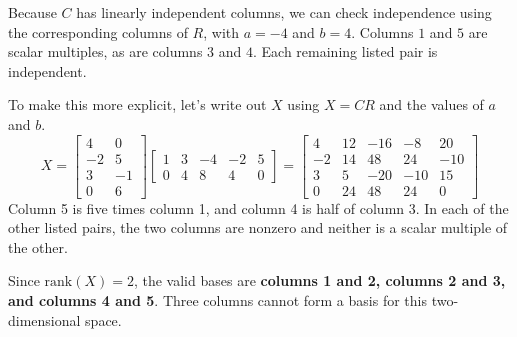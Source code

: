 \documentclass[11pt]{article}
\begin{document}
\begin{prob}[(16 pts)]
\begin{subprob}






\begin{solution}
Because $C$ has linearly independent columns, we can check independence using the corresponding columns of $R$, with $a=-4$ and $b=4$. Columns $1$ and $5$ are scalar multiples, as are columns $3$ and $4$. Each remaining listed pair is independent.

To make this more explicit, let's write out $X$ using $X=CR$ and the values of $a$ and $b$.
\[
X=
\begin{bmatrix}4&0\\-2&5\\3&-1\\0&6\end{bmatrix}
\begin{bmatrix}1&3&-4&-2&5\\0&4&8&4&0\end{bmatrix}
=
\begin{bmatrix}
4&12&-16&-8&20\\
-2&14&48&24&-10\\
3&5&-20&-10&15\\
0&24&48&24&0
\end{bmatrix}
\]
Column 5 is five times column 1, and column 4 is half of column 3. In each of the other listed pairs, the two columns are nonzero and neither is a scalar multiple of the other.

Since $\text{rank}(X)=2$, the valid bases are \textbf{columns 1 and 2, columns 2 and 3, and columns 4 and 5}. Three columns cannot form a basis for this two-dimensional space.
\end{solution}
\end{subprob}
\end{prob}
\newpage
\end{document}
